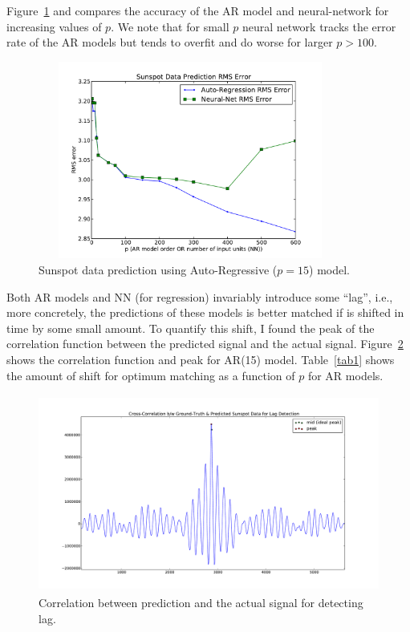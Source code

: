\documentclass[11pt]{report}
\begin{document}
Figure~\ref{fig:ss_err} and compares the accuracy of the AR model and neural-network for increasing values of $p$. We note that for small $p$ neural network tracks the error rate of the AR models but tends to overfit and do worse for larger $p  > 100$.
\begin{figure}[htp]
\begin{center}
\includegraphics[width=10cm,height=6.5cm]{figs/sunspot_fit_error.pdf}
\end{center}
\caption[]{Sunspot data prediction using Auto-Regressive ($p=15$) model.}
\label{fig:ss_err}
\end{figure}

Both AR models and NN (for regression) invariably introduce some ``lag'', i.e., more concretely, the predictions of these models is better matched if is shifted in time by some small amount. To quantify this shift, I found the peak of the correlation function between the predicted signal and the actual signal. Figure~\ref{fig:ss_corr} shows the correlation function and peak for AR(15) model. Table~\ref{tab1} shows the amount of shift for optimum matching as a function of $p$ for AR models.
\begin{figure}[hbp]
\begin{center}
\includegraphics[width=18cm,height=6.5cm]{figs/ss_lag_corr.pdf}
\end{center}
\caption[]{Correlation between prediction and the actual signal for detecting lag.}
\label{fig:ss_corr}
\end{figure}
\end{document}
